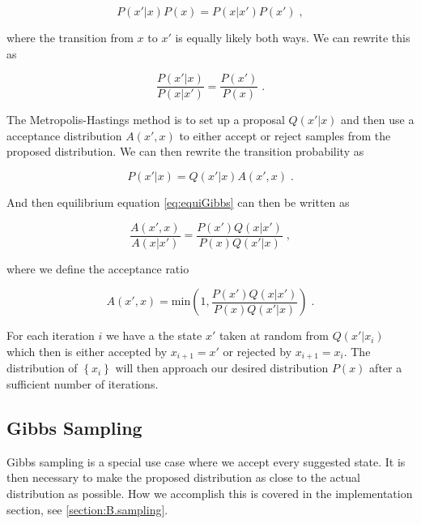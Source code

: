 \begin{equation}
    P(x' | x)P(x) = P(x | x')P(x') \; ,
\end{equation}

where the transition from $x$ to $x'$ is equally likely both ways. We can rewrite this as

\begin{equation} \label{eq:equiGibbs}
    \frac{P(x' | x)}{P(x | x')} = \frac{P(x')}{P(x)} \; .
\end{equation}

The Metropolis-Hastings method is to set up a proposal $Q(x' | x)$ and then use a acceptance distribution $A(x', x)$ to either accept or reject samples from the proposed distribution. We can then rewrite the transition probability as

\begin{equation}
    P(x' | x) = Q(x' | x)A(x', x) \; .
\end{equation}

And then equilibrium equation \ref{eq:equiGibbs} can then be written as

\begin{equation}\label{eq:methas}
    \frac{A(x',  x)}{  A(x | x')} = \frac{P(x')Q(x|x')}{P(x)Q(x'|x)} \; ,
\end{equation}

where we define the acceptance ratio

\begin{equation}
    A(x', x) = \text{min} \left ( 1, \frac{P(x')Q(x|x')}{P(x)Q(x'|x)} \right ) \; .
\end{equation}

For each iteration $i$ we have a the state $x'$ taken at random from $Q(x' | x_i)$ which then is either accepted by $x_{i+1} = x'$ or rejected by $x_{i+1} = x_i$. The distribution of $\left \{ x_i \right \}$ will then approach our desired distribution $P(x)$ after a sufficient number of iterations.

\subsection{Gibbs Sampling}

Gibbs sampling is a special use case where we accept every suggested state. It is then necessary to make the proposed distribution as close to the actual distribution as possible. How we accomplish this is covered in the  implementation section, see \ref{section:B.sampling}.
